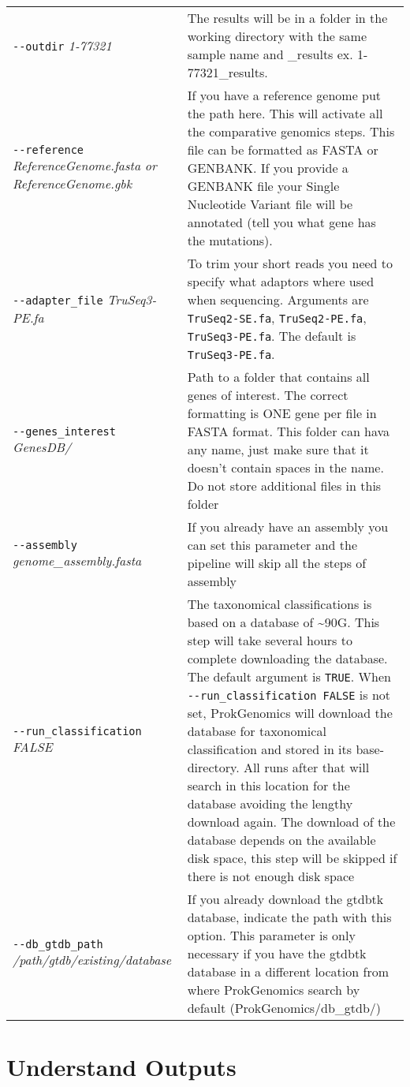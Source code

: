 \documentclass[
]{book}
\begin{document}
\begin{longtable}[]{@{}
  >{\raggedright\arraybackslash}p{}
  >{\raggedright\arraybackslash}p{}@{}}
\texttt{-\/-outdir} \emph{1-77321} & The results will be in a folder in the working directory with the same sample name and \_results ex. 1-77321\_results. \\
\texttt{-\/-reference} \emph{ReferenceGenome.fasta or ReferenceGenome.gbk} & If you have a reference genome put the path here. This will activate all the comparative genomics steps. This file can be formatted as FASTA or GENBANK. If you provide a GENBANK file your Single Nucleotide Variant file will be annotated (tell you what gene has the mutations). \\
\texttt{-\/-adapter\_file} \emph{TruSeq3-PE.fa} & To trim your short reads you need to specify what adaptors where used when sequencing. Arguments are \texttt{TruSeq2-SE.fa}, \texttt{TruSeq2-PE.fa}, \texttt{TruSeq3-PE.fa}. The default is \texttt{TruSeq3-PE.fa}. \\
\texttt{-\/-genes\_interest} \emph{GenesDB/} & Path to a folder that contains all genes of interest. The correct formatting is ONE gene per file in FASTA format. This folder can hava any name, just make sure that it doesn't contain spaces in the name. Do not store additional files in this folder \\
\texttt{-\/-assembly} \emph{genome\_assembly.fasta} & If you already have an assembly you can set this parameter and the pipeline will skip all the steps of assembly \\
\texttt{-\/-run\_classification} \emph{FALSE} & The taxonomical classifications is based on a database of \textasciitilde90G. This step will take several hours to complete downloading the database. The default argument is \texttt{TRUE}. When \texttt{-\/-run\_classification\ FALSE} is not set, ProkGenomics will download the database for taxonomical classification and stored in its base-directory. All runs after that will search in this location for the database avoiding the lengthy download again. The download of the database depends on the available disk space, this step will be skipped if there is not enough disk space \\
\texttt{-\/-db\_gtdb\_path} \emph{/path/gtdb/existing/database} & If you already download the gtdbtk database, indicate the path with this option. This parameter is only necessary if you have the gtdbtk database in a different location from where ProkGenomics search by default (ProkGenomics/db\_gtdb/) \\
\end{longtable}

\hypertarget{understand-outputs}{%
\chapter{Understand Outputs}\label{understand-outputs}}
\end{document}
